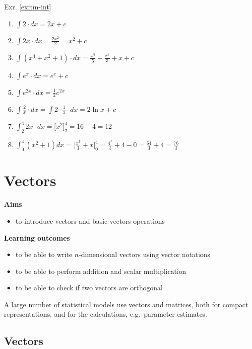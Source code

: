 \documentclass[
]{book}
\providecommand{\tightlist}{%
  \setlength{\itemsep}{0pt}\setlength{\parskip}{0pt}}
\theoremstyle{definition}
\theoremstyle{definition}
\theoremstyle{definition}
\theoremstyle{remark}
\begin{document}
Exr. \ref{exr:m-int}

\begin{enumerate}
\def\labelenumi{\alph{enumi})}
\tightlist
\item
  \(\int 2 \cdot dx = 2x +c\)
\item
  \(\int 2x\cdot dx = \frac{2x^2}{2} = x^2 + c\)
\item
  \(\int (x^4 + x^2 + 1)\cdot dx = \frac{x^5}{5} + \frac{x^3}{3} + x + c\)
\item
  \(\int e^x\cdot dx = e^x + c\)
\item
  \(\int e^{2x}\cdot dx = \frac{1}{2}e^{2x}\)
\item
  \(\int \frac{2}{x}\cdot dx =\int 2\cdot \frac{1}{x}\cdot dx = 2 \ln{x}+ c\)
\item
  \(\int_2^4 2x\cdot dx = \Bigr[x^2\Bigr]_2^4 = 16 - 4 = 12\)
\item
  \(\int_0^4 (x^2+1)dx = \Bigr[\frac{x^3}{3} + x \Bigr]_0^4=\frac{4^3}{3}+4 - 0 = \frac{64}{3}+4 = \frac{76}{3}\)
\end{enumerate}

\hypertarget{vectors}{%
\chapter{Vectors}\label{vectors}}

\textbf{Aims}

\begin{itemize}
\tightlist
\item
  to introduce vectors and basic vectors operations
\end{itemize}

\textbf{Learning outcomes}

\begin{itemize}
\tightlist
\item
  to be able to write \(n\)-dimensional vectors using vector notations
\item
  to be able to perform addition and scalar multiplication
\item
  to be able to check if two vectors are orthogonal
\end{itemize}

A large number of statistical models use vectors and matrices, both for compact representations, and for the calculations, e.g.~parameter estimates.

\hypertarget{vectors-1}{%
\section{Vectors}\label{vectors-1}}
\end{document}
